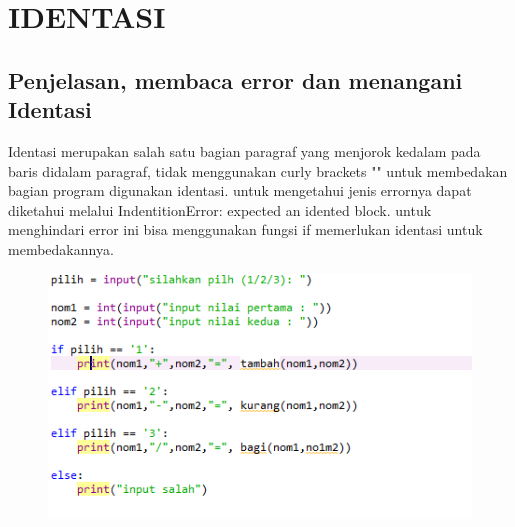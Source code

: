 \chapter*{IDENTASI}

\section*{Penjelasan, membaca error dan menangani Identasi}

\par
Identasi merupakan salah satu bagian paragraf yang menjorok kedalam pada baris didalam paragraf, tidak menggunakan curly brackets "{}" untuk membedakan bagian program digunakan identasi. untuk mengetahui jenis errornya dapat diketahui melalui IndentitionError: expected an idented block. untuk menghindari error ini bisa menggunakan fungsi if memerlukan identasi untuk membedakannya.

\begin{figure} [h]
	\includegraphics[width=12cm]{section/spy/li.png}
	\centering
	\end{figure}
	
	
	

